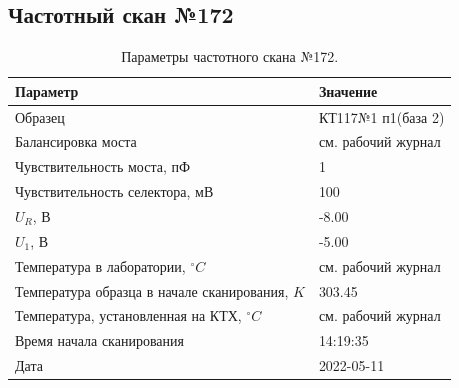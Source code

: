 \subsection{Частотный скан №172}
\begin{table}[!ht]
    \centering
    \caption{Параметры частотного скана №172.}
    \begin{tabular}{|l|l|}
        \hline
        Параметр                                       & Значение                  \\ \hline
        Образец                                        & КТ117№1 п1(база 2)        \\ \hline
        Балансировка моста                             & см. рабочий журнал        \\ \hline
        Чувствительность моста, пФ                     & 1                         \\ \hline
        Чувствительность селектора, мВ                 & 100                       \\ \hline
        $U_R$, В                                       & -8.00                     \\ \hline
        $U_1$, В                                       & -5.00                     \\ \hline
        Температура в лаборатории, $^\circ C$          & см. рабочий журнал        \\ \hline
        Температура образца в начале сканирования, $K$ & 303.45                    \\ \hline
        Температура, установленная на КТХ, $^\circ C$  & см. рабочий журнал        \\ \hline
        Время начала сканирования                      & 14:19:35                  \\ \hline
        Дата                                           & 2022-05-11                \\ \hline
    \end{tabular}
    \label{table:frequency_scan_172}
\end{table}

